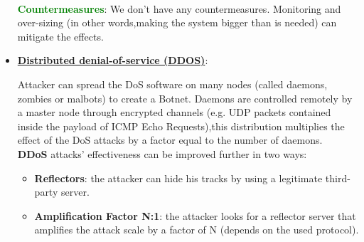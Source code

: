 \begin{itemize}
    \\
    \textcolor{green}{\textbf{Countermeasures}}: We don’t have any countermeasures. Monitoring and over-sizing (in other words,making the system bigger than is needed) can mitigate the effects.
    \newpage
    \item \underline{\textbf{Distributed denial-of-service (DDOS)}}:
    \\
    \begin{minipage}{0.6\textwidth}
    \vspace{0.3cm}
    Attacker can spread the DoS software on many nodes (called daemons, zombies or malbots) to create a Botnet. Daemons are controlled remotely by a master node through encrypted channels (e.g. UDP packets contained inside the payload of ICMP Echo Requests),this distribution multiplies the effect of the DoS attacks by a factor equal to the number of daemons. \\\textbf{DDoS} attacks’ effectiveness can be improved further in two ways:
    \begin{itemize}
        \item \textbf{Reflectors}: the attacker can hide his tracks by using a legitimate third-party server.
        \item \textbf{Amplification Factor N:1}: the attacker looks for a reflector server that amplifies the attack scale by a factor of N (depends on the used protocol).
    \end{itemize}


\end{minipage}
\end{itemize}
